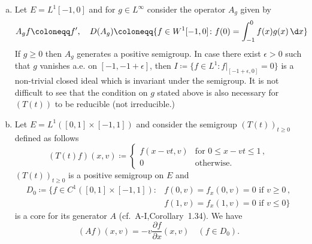 \begin{examples}
\begin{enumerate}[(a), wide]
	\item 
	Let $E = L^{1}[-1,0]$ and for $g \in L^{\infty}$ consider the operator $A_{g}$ given by
	\begin{equation}\label{eq:c3-3.2}
		A_{g}f \coloneqq f', \quad D(A_{g}) \coloneqq \{f \in W^{1}[-1,0] \colon f(0) = \int_{-1}^{0} f(x)g(x)\,\d x\}
	\end{equation}
	If $g \geq 0$ then $A_{g}$ generates a positive semigroup.
	In case there exist $\epsilon > 0$ such that $g$ vanishes a.e. on $[-1,-1+\epsilon]$, then $I \coloneqq \{f \in L^{1} \colon f|_{[-1+\epsilon,0]} = 0\}$ is a non-trivial closed ideal which is invariant under the semigroup.
	It is not difficult to see that the condition on $g$ stated above is also necessary for $(T(t))$ to be reducible (\ie  not irreducible.)
%
	\item 
	Let $E = L^{1}([0,1]\times[-1,1])$ and consider the semigroup $(T(t))_{t\geq 0}$ defined as follows
	\begin{equation}\label{eq:c3-3.3}
		(T(t)f)(x,v) \coloneqq \begin{cases}
			f(x-vt,v) & \text{for } 0 \leq x-vt \leq 1 \,,\\
			0 & \text{otherwise}.
		\end{cases}
	\end{equation}
		$(T(t))_{t\geq 0}$ is a positive semigroup on $E$ and
	\begin{align*}\label{eq:c3-D0}
		D_{0} \coloneqq \{f \in C^{1}([0,1]\times[-1,1]) \colon  
		& f(0,v) = f_{x}(0,v) = 0 \text{ if } v \geq 0\,,\\ 
		& f(1,v) = f_{x}(1,v) = 0 \text{ if } v \leq 0\}
	\end{align*}
	is a core for its generator $A$ (cf.\ A-I,Corollary~1.34).
	We have
	\begin{equation}\label{eq:c3-3.4}
		(Af)(x,v) = -v\frac{\partial f}{\partial x}(x,v) \quad (f \in D_{0}).
	\end{equation}
	

\end{enumerate}
\end{examples}
